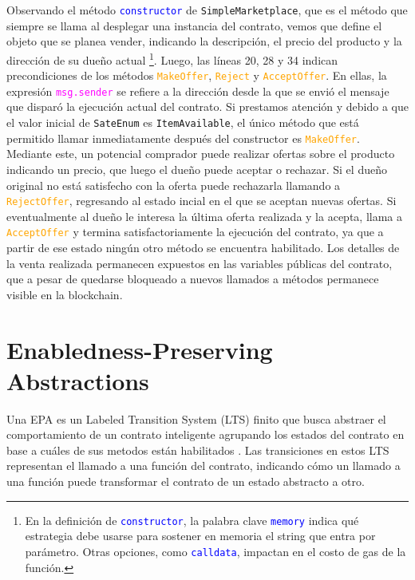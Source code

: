 Observando el método \textcolor{blue}{\texttt{constructor}} de \texttt{SimpleMarketplace}, que es el método que siempre se llama al desplegar una instancia del contrato, vemos que define el objeto que se planea vender, indicando la descripción, el precio del producto y la dirección de su dueño actual \footnote{En la definición de \textcolor{blue}{\texttt{constructor}}, la palabra clave \textcolor{blue}{\texttt{memory}} indica qué estrategia debe usarse para sostener en memoria el string que entra por parámetro. Otras opciones, como \textcolor{blue}{\texttt{calldata}}, impactan en el costo de gas de la función.}.
Luego, las líneas 20, 28 y 34 indican precondiciones de los métodos \textcolor{orange}{\texttt{MakeOffer}}, \textcolor{orange}{\texttt{Reject}} y \textcolor{orange}{\texttt{AcceptOffer}}.
En ellas, la expresión \textcolor{magenta}{\texttt{msg.sender}} se refiere a la dirección desde la que se envió el mensaje que disparó la ejecución actual del contrato.
Si prestamos atención y debido a que el valor inicial de \texttt{SateEnum} es \texttt{ItemAvailable}, el único método que está permitido llamar inmediatamente después del constructor es \textcolor{orange}{\texttt{MakeOffer}}.
Mediante este, un potencial comprador puede realizar ofertas sobre el producto indicando un precio, que luego el dueño puede aceptar o rechazar.
Si el dueño original no está satisfecho con la oferta puede rechazarla llamando a \textcolor{orange}{\texttt{RejectOffer}}, regresando al estado incial en el que se aceptan nuevas ofertas.
Si eventualmente al dueño le interesa la última oferta realizada y la acepta, llama a \textcolor{orange}{\texttt{AcceptOffer}} y termina satisfactoriamente la ejecución del contrato, ya que
a partir de ese estado ningún otro método se encuentra habilitado. Los detalles de la venta realizada permanecen expuestos en las variables públicas del contrato, que a pesar de quedarse bloqueado a nuevos llamados a métodos permanece visible en la blockchain.


\section{Enabledness-Preserving Abstractions}


Una EPA es un Labeled Transition System (LTS) finito que busca abstraer el comportamiento de un contrato inteligente agrupando los estados del contrato en base a cuáles de sus metodos están habilitados \cite{de-caso-epa}.
Las transiciones en estos LTS representan el llamado a una función del contrato, indicando cómo un llamado a una función puede transformar el contrato de un estado abstracto a otro.

